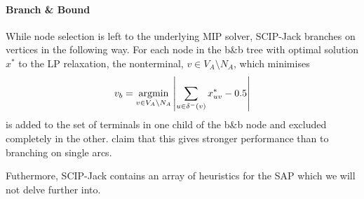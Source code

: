   \paragraph{Branch \& Bound}
  While node selection is left to the underlying MIP solver, SCIP-Jack branches on vertices in the following way. For each node in the
  b\&b tree with optimal solution $x^*$ to the LP relaxation, the nonterminal, $v \in V_A \setminus N_A$, which minimises
  $$v_b = \operatorname*{argmin}_{v \in V_A \setminus N_A} \left| \sum_{u \in \delta^-(v)} x^*_{uv} - 0.5 \right|$$
  is added to the set of terminals in one child of the b\&b node and excluded completely in the other.
  \cite{gamrath2017scip} claim that this gives stronger performance than
  to branching on single arcs.

  Futhermore, SCIP-Jack contains an array of heuristics for the SAP which we will not delve further into.


